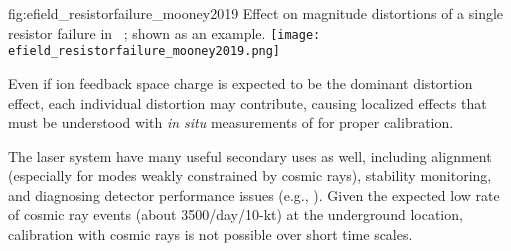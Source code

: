 \begin{dunefigure}{fig:efield_resistorfailure_mooney2019}
{Effect on \efield magnitude distortions of a single  resistor failure in ~\cite{bib:mooney2019a}; shown as an example. 
}
\texttt{[image: efield\_resistorfailure\_mooney2019.png]}
\end{dunefigure}


Even if ion feedback space charge is expected to be the dominant \efield distortion effect,
each individual \efield distortion may contribute, causing localized effects that must be understood with \textit{in situ} measurements of \efield for proper calibration. 

The laser system have many useful secondary uses as well, including alignment (especially for modes weakly constrained by cosmic rays),
stability monitoring, and diagnosing detector performance issues
(e.g., ).  
Given the expected low rate of cosmic ray events (about 3500/day/10-kt) at the underground location, calibration with cosmic rays is not possible over short time scales. 


